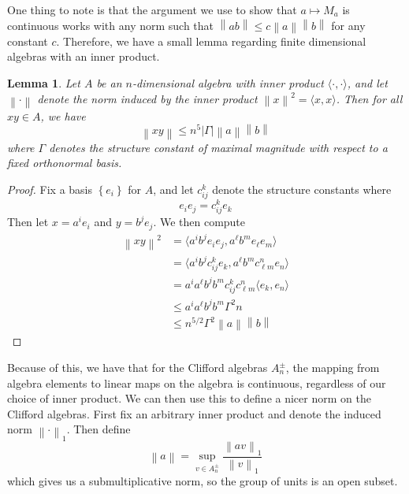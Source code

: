 \documentclass[psamsfonts]{amsart}
\newtheorem*{lem*}{Lemma}
\theoremstyle{definition}
\theoremstyle{remark}
\newcommand{\set}[1]{\left\lbrace #1 \right\rbrace}
\newcommand{\abs}[1]{\left\lvert#1\right\rvert}
\newcommand{\norm}[1]{\left\lVert#1\right\rVert}
\begin{document}
One thing to note is that the argument we use to show that $a \mapsto M_a$ is continuous works with any norm such that $\norm{ab} \leq c \norm{a}\norm{b}$ for any constant $c$. Therefore, we have a small lemma regarding finite dimensional algebras with an inner product.
%
\begin{lem*}
Let $A$ be an $n$-dimensional algebra with inner product $\langle \cdot,\cdot\rangle$, and let $\norm{\cdot}$ denote the norm induced by the inner product $\norm{x}^2 = \langle x, x \rangle$. Then for all $xy \in A$, we have 
$$\norm{xy} \leq n^5\abs{\Gamma}\norm{a}\norm{b} $$
where $\Gamma$ denotes the structure constant of maximal magnitude with respect to a fixed orthonormal basis.
\end{lem*}
%
\begin{proof}
Fix a basis $\set{e_i}$ for $A$, and let $c^k_{ij}$ denote the structure constants where
$$e_ie_j = c^k_{ij}e_k $$
Then let $x = a^ie_i$ and $y = b^je_j$. We then compute
\begin{align*}
\norm{xy}^2 &= \langle a^ib^je_ie_j, a^\ell b^m e_\ell e_m \rangle \\
&= \langle a^ib^jc^k_{ij}e_k, a^\ell b^m c^n_{\ell m}e_n \rangle \\
&= a^i a^\ell b^j b^m c^k_{ij} c^n_{\ell m} \langle e_k , e_n \rangle \\
&\leq a^i a^\ell b^j b^m \Gamma^2  n \\
&\leq n^{5/2} \Gamma^2 \norm{a}\norm{b}
\end{align*}
\end{proof}
Because of this, we have that for the Clifford algebras $A^\pm_n$, the mapping from algebra elements to linear maps on the algebra is continuous, regardless of our choice of inner product. We can then use this to define a nicer norm on the Clifford algebras. First fix an arbitrary inner product and denote the induced norm $\norm{\cdot}_1$. Then define 
$$\norm{a} = \sup_{v \in A^{\pm}_n}\frac{\norm{av}_1}{\norm{v}_1} $$
which gives us a submultiplicative norm, so the group of units is an open subset. 
\end{document}
